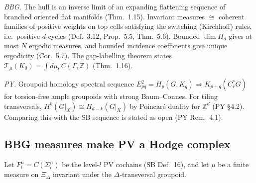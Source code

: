 \documentclass[11pt]{article}
\theoremstyle{definition}
\theoremstyle{remark}
\newcommand{\Z}{\mathbb Z}
\begin{document}
\emph{BBG.} The hull is an inverse limit of an expanding flattening sequence of branched oriented flat manifolds (Thm.~1.15). Invariant measures $\cong$ coherent families of positive weights on top cells satisfying the switching (Kirchhoff) rules, i.e.\ positive $d$-cycles (Def.~3.12, Prop.~5.5, Thm.~5.6). Bounded $\dim H_d$ gives at most $N$ ergodic measures, and bounded incidence coefficients give unique ergodicity (Cor.~5.7). The gap-labelling theorem states $\mathcal T_\mu(K_0)=\int d\mu_t\,C(\Gamma,\Z)$ (Thm.~1.16).

\emph{PY.} Groupoid homology spectral sequence $E^2_{pq}=H_p(G,K_q)\Rightarrow K_{p+q}(C^*_rG)$ for torsion-free ample groupoids with strong Baum--Connes. For tiling transversals, $H^k(G|_X)\cong H_{d-k}(G|_X)$ by Poincar\'e duality for $\Z^d$ (PY \S4.2). Comparing this with the SB sequence is stated as open (PY Rem.~4.1).

\subsection{BBG measures make PV a Hodge complex}

Let $F_l^n=C(\Sigma^n_l)$ be the level-$l$ PV cochains (SB Def.~16), and let $\mu$ be a finite measure on $\Xi_\Delta$ invariant under the $\Delta$-transversal groupoid.
\end{document}
